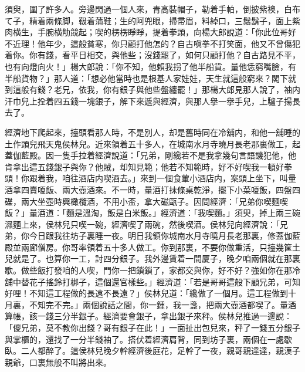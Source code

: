 須臾，圍了許多人。旁邊閃過一個人來，青高裝帽子，勒着手帕，倒披紫襖，白布て子，精着兩條脚，靸着蒲鞋；生的阿兜眼，掃帚眉，料綽口，三鬚鬍子，面上紫肉横生，手腕横觔競起；喫的楞楞睜睜，提着拳頭，向楊大郎說道：「你此位哥好不近理！他年少，這般貧寒，你只顧打他怎的？自古嗔拳不打笑面，他又不曾傷犯着你。你有錢，看平日相交，與他些；沒錢罷了，如何只顧打他？自古路見不平，也有向燈向火！」楊大郎說：「你不知，他賴我拐了他半船貨。量他恁窮嘴臉，有半船貨物？」那人道：「想必他當時也是根基人家娃娃，天生就這般窮來？閣下就到這般有錢？老兄，依我，你有銀子與他些盤纏罷！」那楊大郎見那人說了，袖内汗巾兒上拴着四五錢一塊銀子，解下來遞與經濟，與那人擧一擧手兒，上驢子揚長去了。

經濟地下爬起來，擡頭看那人時，不是別人，却是舊時同在冷舖内，和他一舖睡的土作頭兒飛天鬼侯林兒。近來領着五十多人，在城南水月寺曉月長老那裏做工，起蓋伽藍殿。因一隻手拉着經濟說道：「兄弟，剛纔若不是我拿幾句言語譏犯他，他肯拿出這五錢銀子與你？他賊，却知見範；他若不知範時，好不好喫我一頓好拳頭！你跟着我，咱往酒店内喫酒去。」來到一個食葷小酒店内，案頭上坐下，叫量酒拿四賣嗄飯、兩大壺酒來。不一時，量酒打抹條桌乾淨，擺下小菜嗄飯，四盤四碟，兩大坐壺時興橄欖酒，不用小盃，拿大磁甌子。因問經濟：「兄弟你喫麵喫飯？」量酒道：「麵是溫淘，飯是白米飯。」經濟道：「我喫麵。」須臾，掉上兩三碗濕麵上來，侯林兒只喫一碗，經濟喫了兩碗，然後喫酒。侯林兒向經濟說：「兄弟，你今日跟我往坊子裏睡一夜。明日我領你城南水月寺曉月長老那裏，修蓋伽藍殿並兩廊僧房。你哥率領着五十多人做工。你到那裏，不要你做重活，只擡幾筐土兒就是了。也算你一工，討四分銀子。我外邊賃着一間厦子，晚夕咱兩個就在那裏歇。做些飯打發咱的人喫，門你一把鎖鎖了，家都交與你，好不好？強如你在那冷舖中替花子搖鈴打梆子，這個還官樣些。」經濟道：「若是哥哥這般下顧兄弟，可知好哩！不知這工程做的長遠不長遠？」侯林兒道：「纔做了一個月。這工程做到十月裏，不知完不完。」兩個說話之間，你一鍾，我一盞，把兩大壺酒都喫了。量酒算帳，該一錢三分半銀子。經濟要會銀子，拿出銀子來秤。侯林兒推過一邊說：「儍兄弟，莫不教你出錢？哥有銀子在此！」一面扯出包兒來，秤了一錢五分銀子與掌櫃的，還找了一分半錢袖了。搭伏着經濟肩背，同到坊子裏，兩個在一處歇臥。二人都醉了。這侯林兒晚夕幹經濟後庭花，足幹了一夜，親哥親達達，親漢子親爺，口裏無般不叫將出來。

